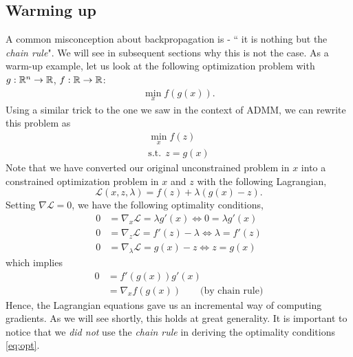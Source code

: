 \documentclass[12pt]{article}
\begin{document}
\subsection{Warming up}
A common misconception about backpropagation is - `` it is nothing but the \textit{chain rule}". We will see in subsequent sections why this is not the case.  As a warm-up example, let us look at the following optimization problem with $g: \mathbb{R}^n \rightarrow \mathbb{R}$, $f: \mathbb{R} \rightarrow \mathbb{R}$:
\begin{align}
\min_{x} f(g(x)).
\end{align}
Using a similar trick to the one we saw in the context of ADMM, we can rewrite this problem as
\begin{align}
\min_{x} f(z) \\
\text{s.t.} \ \ z = g(x) \nonumber 
\end{align}
Note that we have converted our original unconstrained problem in $x$ into a constrained optimization problem in $x$ and $z$ with the following Lagrangian,
\begin{equation}
\mathcal{L} (x, z, \lambda) = f(z) + \lambda(g(x) - z).
\end{equation}
Setting $\nabla \mathcal{L} = 0$,  we have the following optimality conditions,
\begin{subequations}
\label{eq:opt}
\begin{align}
0 &= \nabla_x \mathcal{L} = \lambda g'(x) \Leftrightarrow 0 = \lambda g'(x) \label{eq:optx} \\
0 &= \nabla_z \mathcal{L} = f'(z) - \lambda \Leftrightarrow \lambda = f'(z) \label{eq:optz} \\
0 &= \nabla_{\lambda} \mathcal{L} = g(x) - z \Leftrightarrow z = g(x) \label{eq:optlambda}
\end{align}
\end{subequations}
which implies 
\begin{align}
0 &= f'(g(x))g'(x) \nonumber \\
&= \nabla_x f(g(x)) \nonumber \qquad \text{(by chain rule)} 
\end{align}
Hence, the Lagrangian equations gave us an incremental way of computing gradients. As we will see shortly, this holds at great generality. It is important to notice that we \textit{did not} use the \textit{chain rule} in deriving the optimality conditions \eqref{eq:opt}.
\end{document}
